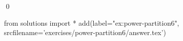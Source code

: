 
\begin{ex} 
  \label{ex:power-partition6}
  
  \qed
\end{ex} 
\begin{python0}
from solutions import *
add(label="ex:power-partition6",
    srcfilename='exercises/power-partition6/answer.tex') 
\end{python0}
